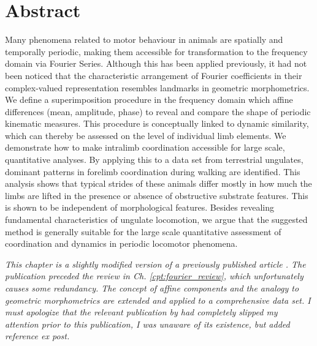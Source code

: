 

\clearpage
\section{Abstract}
Many phenomena related to motor behaviour in animals are spatially and temporally periodic, making them accessible for transformation to the frequency domain via Fourier Series.
Although this has been applied previously, it had not been noticed that the characteristic arrangement of Fourier coefficients in their complex-valued representation resembles landmarks in geometric morphometrics.
We define a superimposition procedure in the frequency domain which  affine differences (mean, amplitude, phase) to reveal and compare the shape of periodic kinematic measures.
This procedure is conceptually linked to dynamic similarity, which can thereby be assessed on the level of individual limb elements.
We demonstrate how to make intralimb coordination accessible for large scale, quantitative analyses.
By applying this to a data set from terrestrial ungulates, dominant patterns in forelimb coordination during walking are identified.
This analysis shows that typical strides of these animals differ mostly in how much the limbs are lifted in the presence or absence of obstructive substrate features.
This is shown to be independent of morphological features.
Besides revealing fundamental characteristics of ungulate locomotion, we argue that the suggested method is generally suitable for the large scale quantitative assessment of coordination and dynamics in periodic locomotor phenomena.


\bigskip
\textit{This chapter is a slightly modified version of a previously published article \citep{Mielke2019}. The publication preceded the review in Ch. \ref{cpt:fourier_review}, which unfortunately causes some redundancy. The concept of affine components and the analogy to geometric morphometrics are extended and applied to a comprehensive data set. I must apologize that the relevant publication by \citet{Pike2002} had completely slipped my attention prior to this publication, I was unaware of its existence, but added reference ex post.
\\}


